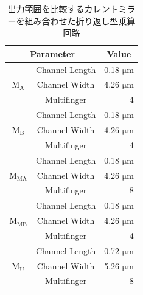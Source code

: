         \begin{table}[!b]
            \centering
            \caption{出力範囲を比較するカレントミラーを組み合わせた折り返し型乗算回路}
            \label{table:3_folded_mirror_com_param}
            \begin{tabular}{c|c|r}
                    \hline
                    \multicolumn{2}{c|}{Parameter}   & \multicolumn{1}{c}{Value}     \\
                    \hline\hline
                    &   Channel Length   &   0.18 $\mathrm{\mu m}$   \\
                    \cline{2-3}
                    $\mathrm{M_{A}}$   &   Channel Width   &   4.26 $\mathrm{\mu m}$   \\
                    \cline{2-3}
                        &   Multifinger   & 4    \\
                    \hline
                    &   Channel Length   &   0.18 $\mathrm{\mu m}$   \\
                    \cline{2-3}
                    $\mathrm{M_{B}}$   &   Channel Width   &   4.26 $\mathrm{\mu m}$   \\
                    \cline{2-3}
                        &   Multifinger   & 4    \\
                    \hline
                    &   Channel Length   &   0.18 $\mathrm{\mu m}$   \\
                    \cline{2-3}
                    $\mathrm{M_{MA}}$   &   Channel Width   &   4.26 $\mathrm{\mu m}$   \\
                    \cline{2-3}
                        &   Multifinger   & 8    \\
                    \hline
                    &   Channel Length   &   0.18 $\mathrm{\mu m}$   \\
                    \cline{2-3}
                    $\mathrm{M_{MB}}$   &   Channel Width   &   4.26 $\mathrm{\mu m}$   \\
                    \cline{2-3}
                        &   Multifinger   & 4    \\
                    \hline
                    &   Channel Length   &   0.72 $\mathrm{\mu m}$   \\
                    \cline{2-3}
                    $\mathrm{M_{U}}$   &   Channel Width   &   5.26 $\mathrm{\mu m}$   \\
                    \cline{2-3}
                        &   Multifinger   & 8    \\
                    \hline

\end{tabular}
\end{table}

